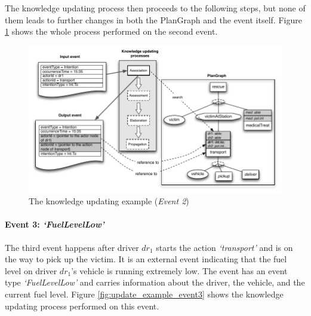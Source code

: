 The knowledge updating process then proceeds to the following steps, but none of them leads to further changes in both the PlanGraph and the event itself. Figure \ref{fig:update_example_event2} shows the whole process performed on the second event.
\begin{figure}[htbp] %
	\centering
	\includegraphics{update_example_event2.pdf} 
	\caption{The knowledge updating example (\emph{Event 2})}
	\label{fig:update_example_event2}
\end{figure}

\paragraph*{Event 3: \emph{`FuelLevelLow'}} %
\label{par:event_3_}
The third event happens after driver $dr_1$ starts the action \emph{`transport'} and is on the way to pick up the victim. It is an external event indicating that the fuel level on driver $dr_1$'s vehicle is running extremely low. The event has an event type \emph{`FuelLevelLow'} and carries information about the driver, the vehicle, and the current fuel level. Figure \ref{fig:update_example_event3} shows the knowledge updating process performed on this event.

